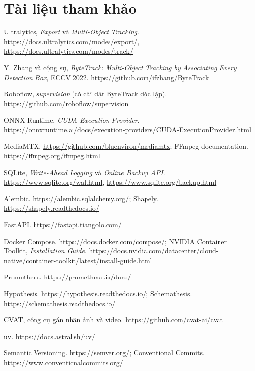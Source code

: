 \documentclass[10pt,a4paper,oneside,openany]{report}
\begin{document}
\chapter{Tài liệu tham khảo}\label{app:ref}
\begin{enumerate}[label={[\arabic*]}, leftmargin=2.2em]
  \item Ultralytics, \emph{Export} và \emph{Multi-Object Tracking}. \url{https://docs.ultralytics.com/modes/export/}, \url{https://docs.ultralytics.com/modes/track/}
  \item Y. Zhang và cộng sự, \emph{ByteTrack: Multi-Object Tracking by Associating Every Detection Box}, ECCV 2022. \url{https://github.com/ifzhang/ByteTrack}
  \item Roboflow, \emph{supervision} (có cài đặt ByteTrack độc lập). \url{https://github.com/roboflow/supervision}
  \item ONNX Runtime, \emph{CUDA Execution Provider}. \url{https://onnxruntime.ai/docs/execution-providers/CUDA-ExecutionProvider.html}
  \item MediaMTX. \url{https://github.com/bluenviron/mediamtx}; FFmpeg documentation. \url{https://ffmpeg.org/ffmpeg.html}
  \item SQLite, \emph{Write-Ahead Logging} và \emph{Online Backup API}. \url{https://www.sqlite.org/wal.html}, \url{https://www.sqlite.org/backup.html}
  \item Alembic. \url{https://alembic.sqlalchemy.org/}; Shapely. \url{https://shapely.readthedocs.io/}
  \item FastAPI. \url{https://fastapi.tiangolo.com/}
  \item Docker Compose. \url{https://docs.docker.com/compose/}; NVIDIA Container Toolkit, \emph{Installation Guide}.
        \url{https://docs.nvidia.com/datacenter/cloud-native/container-toolkit/latest/install-guide.html}
  \item Prometheus. \url{https://prometheus.io/docs/}
  \item Hypothesis. \url{https://hypothesis.readthedocs.io/}; Schemathesis. \url{https://schemathesis.readthedocs.io/}
  \item CVAT, công cụ gán nhãn ảnh và video. \url{https://github.com/cvat-ai/cvat}
  \item uv. \url{https://docs.astral.sh/uv/}
  \item Semantic Versioning. \url{https://semver.org/}; Conventional Commits. \url{https://www.conventionalcommits.org/}
\end{enumerate}
\end{document}

